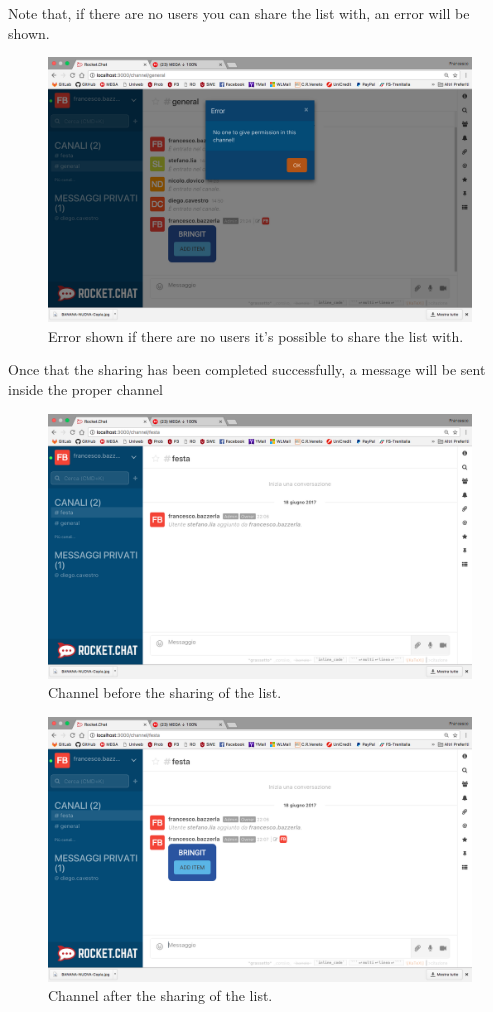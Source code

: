 Note that, if there are no users you can share the list with, an error will be shown.

\begin{figure}[H]
  \centering 
  \includegraphics[width=\textwidth]{Sections/3-HowToUse/Images/popup_permission_give_error.png}
  \caption{Error shown if there are no users it's possible to share the list with.}
\end{figure}

Once that the sharing has been completed successfully, a message will be sent inside the proper channel


\begin{figure}[H]
  \centering 
  \includegraphics[width=\textwidth]{Sections/3-HowToUse/Images/share_group_before.png}
  \caption{Channel before the sharing of the list.}
\end{figure}

\begin{figure}[H]
  \centering 
  \includegraphics[width=\textwidth]{Sections/3-HowToUse/Images/share_group_after.png}
  \caption{Channel after the sharing of the list.}
\end{figure}